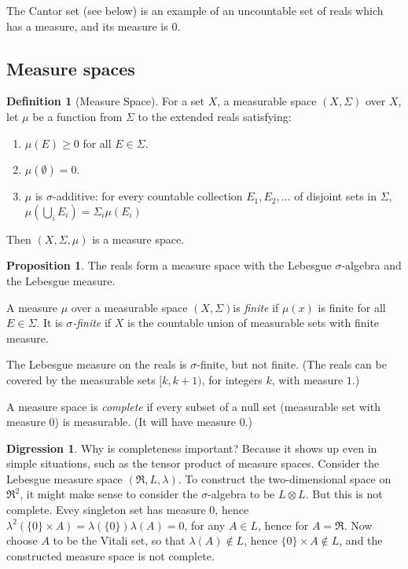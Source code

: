 \documentclass{article}
\theoremstyle{definition}
\newtheorem{definition}{Definition}[section]
\newtheorem{proposition}[theorem]{Proposition}
\newtheorem{digression}[theorem]{Digression}
\begin{document}
The Cantor set (see below) is an example of an uncountable set of reals which has a measure, and its measure is \(0\). 

\subsection{Measure spaces}
\begin{definition}[Measure Space] For a set \(X\), a measurable space \((X,\Sigma)\) over \(X\), let \(\mu\) be a function from \(\Sigma\) to the extended reals satisfying:
  \begin{enumerate}
  \item \(\mu(E) \geq 0\) for all \(E \in \Sigma\).
  \item \(\mu(\emptyset)=0\).
  \item \(\mu\) is \(\sigma\)-additive: for every countable collection \(E_1, E_2, \ldots\) of disjoint sets in \(\Sigma\), \(\mu(\bigcup_i E_i)=\Sigma_i \mu(E_i)\)
  \end{enumerate}
Then \((X,\Sigma,\mu)\) is a measure space.
\end{definition}

\begin{proposition}
  The reals form a measure space with the Lebesgue \(\sigma\)-algebra and the Lebesgue measure.   
\end{proposition}


A measure \(\mu\) over a measurable space \((X,\Sigma)\)is {\em finite} if \(\mu(x)\) is finite for all \(E\in \Sigma\). It is {\em \(\sigma\)-finite} if \(X\) is the countable union of measurable sets with finite measure.

The Lebesgue measure on the reals is \(\sigma\)-finite, but not finite. (The reals can be covered by the measurable sets \([k,k+1)\), for integers \(k\), with measure \(1\).)

  A measure space is {\em complete} if every subset of a null set (measurable set with measure \(0\)) is measurable. (It will have measure \(0\).)
  \begin{digression}
    Why is completeness important? Because it shows up even in simple situations, such as the tensor product of measure spaces. Consider the Lebesgue measure space \((\Re, L, \lambda)\). To construct the two-dimensional space on \(\Re^2\), it might make sense to consider the \(\sigma\)-algebra to be \(L\otimes L\). But this is not complete. Evey singleton set has measure \(0\), hence \(\lambda^2(\{0\}\times A)=\lambda(\{0\}) \lambda(A)=0\), for any \(A \in L\), hence for \(A=\Re\). Now choose \(A\) to be the Vitali set, so that \(\lambda(A)\not\in L\), hence \(\{0\}\times A \not\in L\), and the constructed measure space is not complete.
  \end{digression}
\end{document}
